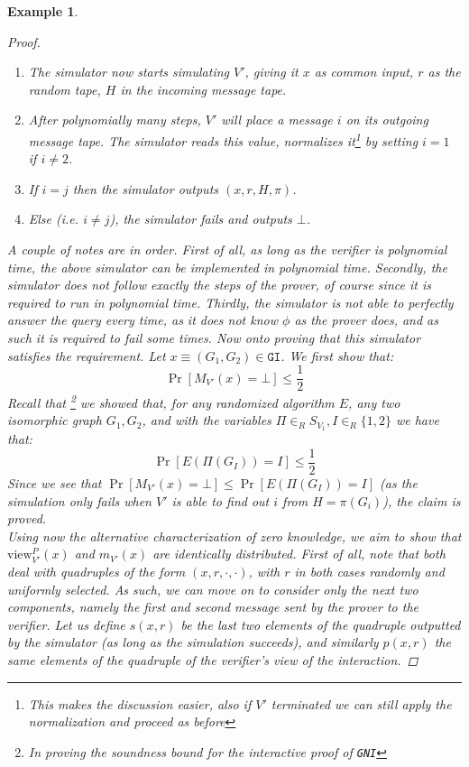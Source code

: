 \documentclass{article}
\newtheorem{example}{Example}
\begin{document}
\begin{example}
\begin{proof}
\begin{enumerate}
            \item The simulator now starts simulating $V'$, giving it $x$ as common input, $r$ as the random tape, $H$ in the incoming message tape.
            \item After polynomially many steps, $V'$ will place a message $i$ on its outgoing message tape. The simulator reads this value, normalizes it\footnote{This makes the discussion easier, also if $V'$ terminated we can still apply the normalization and proceed as before} by setting $i = 1$ if $i \neq 2$. 
            \item If $i = j$ then the simulator outputs $(x, r, H, \pi)$.
            \item Else (i.e. $i \neq j$), the simulator fails and outputs $\bot$.
        \end{enumerate}
        A couple of notes are in order. First of all, as long as the verifier is polynomial time, the above simulator can be implemented in polynomial time. 
        Secondly, the simulator does not follow exactly the steps of the prover, of course since it is required to run in polynomial time. 
        Thirdly, the simulator is not able to perfectly answer the query every time, as it does not know $\phi$ as the prover does, and as such it is required to fail some times. 
        Now onto proving that this simulator satisfies the requirement.
        Let $x \equiv (G_1, G_2) \in \texttt{GI}$.
        We first show that: 
        \[ \Pr[M_{V'}(x) = \bot] \leq \frac{1}{2} \]
        Recall that \footnote{In proving the soundness bound for the interactive proof of \texttt{GNI}} we showed that, for any randomized algorithm $E$, any two isomorphic graph $G_1, G_2$, and with the variables $\Pi \in_R S_{V_1}, I \in_R \{1, 2\}$ we have that:
        \[ \Pr[E(\Pi(G_I)) = I] \leq \frac{1}{2} \]
        Since we see that $\Pr[M_{V'}(x) = \bot] \leq \Pr[E(\Pi(G_I)) = I]$ (as the simulation only fails when $V'$ is able to find out $i$ from $H = \pi(G_i)$), the claim is proved. \\
        Using now the alternative characterization of zero knowledge, we aim to show that $\text{view}^{P}_{V'}(x)$ and $m_{V'}(x)$ are identically distributed.
        First of all, note that both deal with quadruples of the form $(x, r, \cdot, \cdot)$, with $r$  in both cases randomly and uniformly selected. As such, we can move on to consider only the next two components, namely the first and second message sent by the prover to the verifier.
        Let us define $s(x,r)$ be the last two elements of the quadruple outputted by the simulator (as long as the simulation succeeds), and similarly $p(x,r)$ the same elements of the quadruple of the verifier's view of the interaction.

\end{proof}
\end{example}
\end{document}
